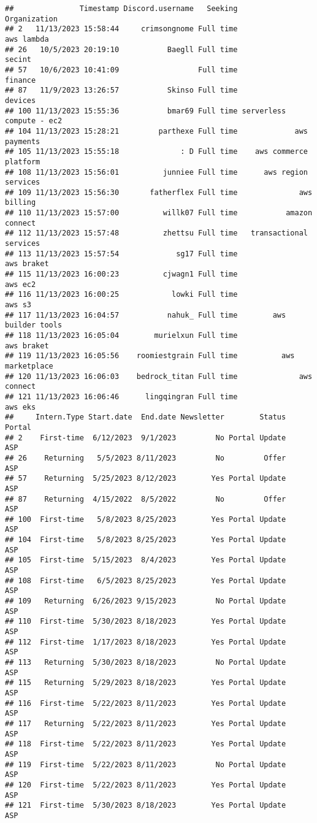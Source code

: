 \documentclass[
]{article}
\begin{document}
\begin{verbatim}
##               Timestamp Discord.username   Seeking             Organization
## 2   11/13/2023 15:58:44     crimsongnome Full time               aws lambda
## 26   10/5/2023 20:19:10           Baegll Full time                   secint
## 57   10/6/2023 10:41:09                  Full time                  finance
## 87   11/9/2023 13:26:57           Skinso Full time                  devices
## 100 11/13/2023 15:55:36           bmar69 Full time serverless compute - ec2
## 104 11/13/2023 15:28:21         parthexe Full time             aws payments
## 105 11/13/2023 15:55:18              : D Full time    aws commerce platform
## 108 11/13/2023 15:56:01          junniee Full time      aws region services
## 109 11/13/2023 15:56:30       fatherflex Full time              aws billing
## 110 11/13/2023 15:57:00          willk07 Full time           amazon connect
## 112 11/13/2023 15:57:48          zhettsu Full time   transactional services
## 113 11/13/2023 15:57:54             sg17 Full time               aws braket
## 115 11/13/2023 16:00:23          cjwagn1 Full time                  aws ec2
## 116 11/13/2023 16:00:25            lowki Full time                   aws s3
## 117 11/13/2023 16:04:57           nahuk_ Full time        aws builder tools
## 118 11/13/2023 16:05:04        murielxun Full time               aws braket
## 119 11/13/2023 16:05:56    roomiestgrain Full time          aws marketplace
## 120 11/13/2023 16:06:03    bedrock_titan Full time              aws connect
## 121 11/13/2023 16:06:46      lingqingran Full time                  aws eks
##     Intern.Type Start.date  End.date Newsletter        Status Portal
## 2    First-time  6/12/2023  9/1/2023         No Portal Update    ASP
## 26    Returning   5/5/2023 8/11/2023         No         Offer    ASP
## 57    Returning  5/25/2023 8/12/2023        Yes Portal Update    ASP
## 87    Returning  4/15/2022  8/5/2022         No         Offer    ASP
## 100  First-time   5/8/2023 8/25/2023        Yes Portal Update    ASP
## 104  First-time   5/8/2023 8/25/2023        Yes Portal Update    ASP
## 105  First-time  5/15/2023  8/4/2023        Yes Portal Update    ASP
## 108  First-time   6/5/2023 8/25/2023        Yes Portal Update    ASP
## 109   Returning  6/26/2023 9/15/2023         No Portal Update    ASP
## 110  First-time  5/30/2023 8/18/2023        Yes Portal Update    ASP
## 112  First-time  1/17/2023 8/18/2023        Yes Portal Update    ASP
## 113   Returning  5/30/2023 8/18/2023         No Portal Update    ASP
## 115   Returning  5/29/2023 8/18/2023        Yes Portal Update    ASP
## 116  First-time  5/22/2023 8/11/2023        Yes Portal Update    ASP
## 117   Returning  5/22/2023 8/11/2023        Yes Portal Update    ASP
## 118  First-time  5/22/2023 8/11/2023        Yes Portal Update    ASP
## 119  First-time  5/22/2023 8/11/2023         No Portal Update    ASP
## 120  First-time  5/22/2023 8/11/2023        Yes Portal Update    ASP
## 121  First-time  5/30/2023 8/18/2023        Yes Portal Update    ASP
\end{verbatim}
\end{document}
